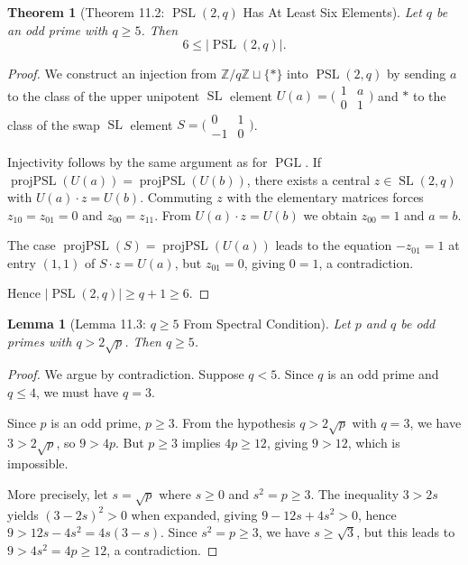 \documentclass[11pt]{article}
\theoremstyle{plain}
\newtheorem*{theorem}{Theorem}
\newtheorem*{lemma}{Lemma}
\theoremstyle{definition}
\theoremstyle{remark}
\begin{document}
\begin{theorem}[Theorem 11.2: $\operatorname{PSL}(2,q)$ Has At Least Six Elements]
Let $q$ be an odd prime with $q \geq 5$. Then
\[
6 \leq |\operatorname{PSL}(2,q)|.
\]
\end{theorem}

\begin{proof}
We construct an injection from $\mathbb{Z}/q\mathbb{Z} \sqcup \{*\}$ into $\operatorname{PSL}(2,q)$ by sending $a$ to the class of the upper unipotent $\operatorname{SL}$ element $U(a) = \bigl(\begin{smallmatrix}1&a\\0&1\end{smallmatrix}\bigr)$ and $*$ to the class of the swap $\operatorname{SL}$ element $S = \bigl(\begin{smallmatrix}0&1\\-1&0\end{smallmatrix}\bigr)$.

Injectivity follows by the same argument as for $\operatorname{PGL}$. If $\operatorname{projPSL}(U(a)) = \operatorname{projPSL}(U(b))$, there exists a central $z \in \operatorname{SL}(2,q)$ with $U(a) \cdot z = U(b)$. Commuting $z$ with the elementary matrices forces $z_{10} = z_{01} = 0$ and $z_{00} = z_{11}$. From $U(a) \cdot z = U(b)$ we obtain $z_{00} = 1$ and $a = b$.

The case $\operatorname{projPSL}(S) = \operatorname{projPSL}(U(a))$ leads to the equation $-z_{01} = 1$ at entry $(1,1)$ of $S \cdot z = U(a)$, but $z_{01} = 0$, giving $0 = 1$, a contradiction.

Hence $|\operatorname{PSL}(2,q)| \geq q + 1 \geq 6$.
\end{proof}

\begin{lemma}[Lemma 11.3: $q \geq 5$ From Spectral Condition]
Let $p$ and $q$ be odd primes with $q > 2\sqrt{p}$. Then $q \geq 5$.
\end{lemma}

\begin{proof}
We argue by contradiction. Suppose $q < 5$. Since $q$ is an odd prime and $q \leq 4$, we must have $q = 3$.

Since $p$ is an odd prime, $p \geq 3$. From the hypothesis $q > 2\sqrt{p}$ with $q = 3$, we have $3 > 2\sqrt{p}$, so $9 > 4p$. But $p \geq 3$ implies $4p \geq 12$, giving $9 > 12$, which is impossible.

More precisely, let $s = \sqrt{p}$ where $s \geq 0$ and $s^2 = p \geq 3$. The inequality $3 > 2s$ yields $(3 - 2s)^2 > 0$ when expanded, giving $9 - 12s + 4s^2 > 0$, hence $9 > 12s - 4s^2 = 4s(3 - s)$. Since $s^2 = p \geq 3$, we have $s \geq \sqrt{3}$, but this leads to $9 > 4s^2 = 4p \geq 12$, a contradiction.
\end{proof}
\end{document}
